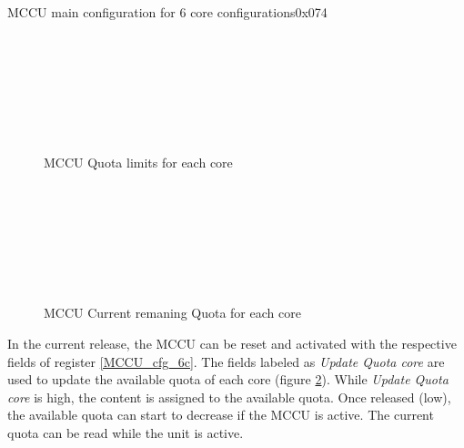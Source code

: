 \begin{register}{}{MCCU main configuration for 6 core configurations}{0x074}
	\label{MCCU_cfg_6c}
	\regnewline
\end{register}
\begin{figure}[H]
	\begin{center}
		 \\
		 \\
		 \\
		 \\
		 \\
		 \\
	\end{center}
	\caption{MCCU Quota limits for each core}\label{fig:MCCU_lim}
\end{figure}
\begin{figure}[H]
	\begin{center}
		 \\
		 \\
		 \\
		 \\
		 \\
		 \\
	\end{center}
	\caption{MCCU Current remaning Quota for each core}\label{fig:MCCU_ava}
\end{figure}
In the current release, the MCCU can be reset and activated with the respective fields of register \ref{MCCU_cfg_6c}. The fields labeled as \textit{Update Quota core} are used to update the available quota of each core (figure \ref{fig:MCCU_ava}). While  \textit{Update Quota core} is high, the content is assigned to the available quota. Once released (low), the available quota can start to decrease if the MCCU is active. The current quota can be read while the unit is active.\\
